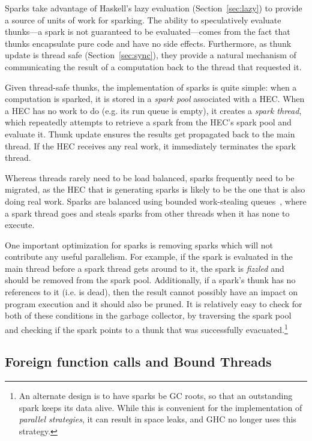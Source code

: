 Sparks take advantage of Haskell's lazy evaluation (Section~\ref{sec:lazy}) to provide a source
of units of work for sparking.  The ability to speculatively evaluate
thunks---a spark is not guaranteed to be evaluated---comes from the fact
that thunks encapsulate pure code and have no side effects.
Furthermore, as thunk update is thread safe (Section~\ref{sec:sync}),
they provide a natural mechanism of communicating the result of a
computation back to the thread that requested it.

Given thread-safe thunks, the implementation of sparks is quite simple:
when a computation is sparked, it is stored in a \emph{spark pool}
associated with a HEC.  When a HEC has no work to do (e.g.
its run queue is empty), it creates a \emph{spark thread}, which
repeatedly attempts to retrieve a spark from the HEC's spark pool
and evaluate it.  Thunk update ensures the results get propagated back
to the main thread. If the HEC receives any real work, it
immediately terminates the spark thread.

Whereas threads rarely need to be load balanced, sparks frequently need
to be migrated, as the HEC that is generating sparks is likely to
be the one that is also doing real work.  Sparks are balanced using
bounded work-stealing queues~\cite{Arora:1998:TSM:277651.277678,Hendler2005}, where a spark thread goes and steals
sparks from other threads when it has none to execute.

One important optimization for sparks is removing sparks which will not
contribute any useful parallelism.  For example, if the spark is
evaluated in the main thread before a spark thread gets around to it,
the spark is \emph{fizzled} and should be removed from the spark pool.
Additionally, if a spark's thunk has no references to it (i.e. is dead),
then the result cannot possibly have an impact on program execution and
it should also be pruned.  It is relatively easy to check for both of
these conditions in the garbage collector, by traversing the spark pool
and checking if the spark points to a thunk that was successfully evacuated.\footnote{An alternate design is to have sparks be GC roots, so that an outstanding spark keeps its data alive. While this is convenient for the implementation of \emph{parallel strategies}, it can result in space leaks, and GHC no longer uses this strategy.}

\subsection{Foreign function calls and Bound Threads}

